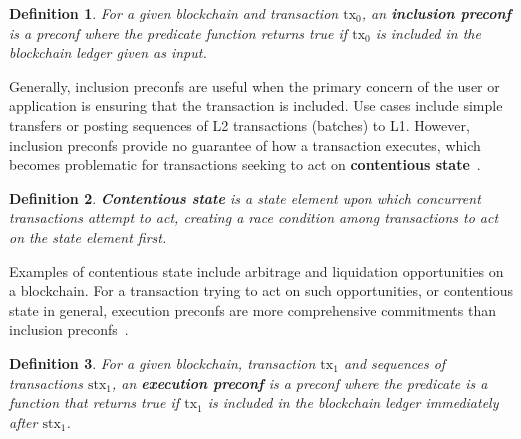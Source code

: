 \documentclass[a4paper]{article}
\theoremstyle{boldstyle}
\newtheorem{definitionx}{Definition}
\newenvironment{definition}
  {\begin{defopenboxq}\begin{definitionx}}
  {\end{definitionx}\end{defopenboxq}}
\newcommand{\ks}[1]{\textcolor{purple}{\textbf{Katerina:} #1}}
\begin{document}
        \begin{definition}
        For a given blockchain and transaction $\mathrm{tx_0}$, an \textbf{inclusion preconf} is a preconf where the predicate function returns true if $\mathrm{tx_0}$ is included in the blockchain ledger given as input.
        \end{definition}        
        Generally, inclusion preconfs are useful when the primary concern of the user or application is ensuring that the transaction is included. Use cases include simple transfers or posting sequences of L2 transactions (batches) to L1.  
        However, inclusion preconfs provide no guarantee of how a transaction executes, which becomes problematic for transactions seeking to act on \textbf{contentious state}~\cite{W:AnalysingExpectedProposerRevenuefromPreconfirmations,W:APricingModelforInclusionPreconfirmations}. 
        \begin{definition}
        \label{def:contentious state}
        \textbf{Contentious state} is a state element upon which concurrent transactions attempt to act, creating a race condition among transactions to act on the state element first.
        \end{definition}
        Examples of contentious state include arbitrage and liquidation opportunities on a blockchain. For a transaction trying to act on such opportunities, or contentious state in general, execution preconfs are more comprehensive commitments than inclusion preconfs~\cite{W:ATaxonomyofPreconfirmationGuaranteesandTheirSlashingConditionsinRollups}.
        \begin{definition}
        For a given blockchain, transaction $\mathrm{tx_1}$ and sequences of transactions $\mathrm{stx}_1$, an \textbf{execution preconf} is a preconf where the predicate is a function that returns true if $\mathrm{tx_1}$ is included in the blockchain ledger immediately after $\mathrm{stx}_1$.
        \end{definition}
\end{document}
